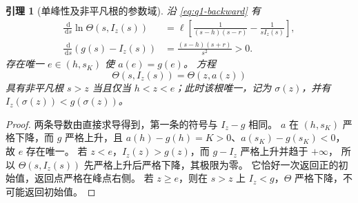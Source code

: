 \documentclass[11pt,a4paper,UTF8]{ctexart}
\newtheorem{lemma}[theorem]{引理}
\theoremstyle{definition}
\newcommand{\dd}{\,\mathrm d}
\begin{document}
\begin{lemma}[单峰性及非平凡根的参数域]
\label{lem:unimodal}
沿 \eqref{eq:q1-backward} 有
\begin{align}
\frac{\dd}{\dd s}\ln\Theta(s,I_z(s))
&=\ell\left[\frac1{(s-h)(s-r)}-\frac1{sI_z(s)}\right],
\label{eq:theta-log-derivative}\\
\frac{\dd}{\dd s}(g(s)-I_z(s))
&=\frac{(s-h)(s+r)}{s^2}>0.
\label{eq:g-minus-i}
\end{align}
存在唯一 $e\in(h,s_K)$ 使 $a(e)=g(e)$。
方程
\begin{equation}
\Theta(s,I_z(s))=\Theta(z,a(z))
\label{eq:switch-condition}
\end{equation}
具有非平凡根 $s>z$ 当且仅当 $h<z<e$；此时该根唯一，记为 $\sigma(z)$，并有
$I_z(\sigma(z))<g(\sigma(z))$。
\end{lemma}
\begin{proof}
两条导数由直接求导得到，第一条的符号与 $I_z-g$ 相同。
$a$ 在 $(h,s_K)$ 严格下降，而 $g$ 严格上升，且
$a(h)-g(h)=K>0$、$a(s_K)-g(s_K)<0$，故 $e$ 存在唯一。
若 $z<e$，$I_z(z)>g(z)$，而 $g-I_z$ 严格上升并趋于 $+\infty$，
所以 $\Theta(s,I_z(s))$ 先严格上升后严格下降，其极限为零。
它恰好一次返回正的初始值，返回点严格在峰点右侧。
若 $z\ge e$，则在 $s>z$ 上 $I_z<g$，$\Theta$ 严格下降，不可能返回初始值。
\end{proof}
\end{document}
